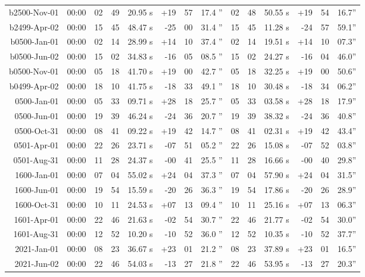 \begin{longtable}{r@{\,}r|r@{h\,}r@{m\,}r<{s}|r@{°\,}r@{'\,}r<{''}||r@{h\,}r@{m\,}r<{s}|r@{°\,}r@{'\,}r<{''}}
b2500-Nov-01 & 00:00  &   02 & 49 & 20.95 & +19 & 57 & 17.4 & 02&48&50.55 & +19&54&16.7\\ %
b2499-Apr-02 & 00:00  &   15 & 45 & 48.47 & -25 & 00 & 31.4 & 15&45&11.28 & -24&57&59.1\\ %
b0500-Jan-01 & 00:00  &   02 & 14 & 28.99 & +14 & 10 & 37.4 & 02&14&19.51 & +14&10&07.3\\ %
b0500-Jun-02 & 00:00  &   15 & 02 & 34.83 & -16 & 05 & 08.5 & 15&02&24.27 & -16&04&46.0\\ %
b0500-Nov-01 & 00:00  &   05 & 18 & 41.70 & +19 & 00 & 42.7 & 05&18&32.25 & +19&00&50.6\\ %
b0499-Apr-02 & 00:00  &   18 & 10 & 41.75 & -18 & 33 & 49.1 & 18&10&30.48 & -18&34&06.2\\ %
 0500-Jan-01 & 00:00  &   05 & 33 & 09.71 & +28 & 18 & 25.7 & 05&33&03.58 & +28&18&17.9\\ %
 0500-Jun-01 & 00:00  &   19 & 39 & 46.24 & -24 & 36 & 20.7 & 19&39&38.32 & -24&36&40.8\\ %
 0500-Oct-31 & 00:00  &   08 & 41 & 09.22 & +19 & 42 & 14.7 & 08&41&02.31 & +19&42&43.4\\ %
 0501-Apr-01 & 00:00  &   22 & 26 & 23.71 & -07 & 51 & 05.2 & 22&26&15.08 & -07&52&03.8\\ %
 0501-Aug-31 & 00:00  &   11 & 28 & 24.37 & -00 & 41 & 25.5 & 11&28&16.66 & -00&40&29.8\\ %
 1600-Jan-01 & 00:00  &   07 & 04 & 55.02 & +24 & 04 & 37.3 & 07&04&57.90 & +24&04&31.5\\ %
 1600-Jun-01 & 00:00  &   19 & 54 & 15.59 & -20 & 26 & 36.3 & 19&54&17.86 & -20&26&28.9\\ %
 1600-Oct-31 & 00:00  &   10 & 11 & 24.53 & +07 & 13 & 09.4 & 10&11&25.16 & +07&13&06.3\\ %
 1601-Apr-01 & 00:00  &   22 & 46 & 21.63 & -02 & 54 & 30.7 & 22&46&21.77 & -02&54&30.0\\ %
 1601-Aug-31 & 00:00  &   12 & 52 & 10.20 & -10 & 52 & 36.0 & 12&52&10.35 & -10&52&37.7\\ %
 2021-Jan-01 & 00:00  &   08 & 23 & 36.67 & +23 & 01 & 21.2 & 08&23&37.89 & +23&01&16.5\\ %
 2021-Jun-02 & 00:00  &   22 & 46 & 54.03 & -13 & 27 & 21.8 & 22&46&53.95 & -13&27&20.3\\ %

\end{longtable}
